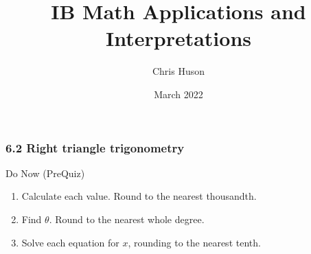 \documentclass[12pt, twoside]{article}
\title{IB Math Applications and Interpretations}
\author{Chris Huson}
\date{March 2022}
\begin{document}
\subsubsection*{6.2 Right triangle trigonometry}
Do Now (PreQuiz)
\begin{enumerate}
\item Calculate each value. Round to the nearest thousandth.
  \begin{enumerate}
  \end{enumerate}
  \vspace{1cm}

\item Find $\theta$. Round to the nearest whole degree.
  \begin{enumerate}
  \end{enumerate} \vspace{2cm}

\item Solve each equation for $x$, rounding to the nearest tenth.
  \begin{enumerate}
  \end{enumerate}
  \vspace{3cm}


\end{enumerate}
\end{document}
